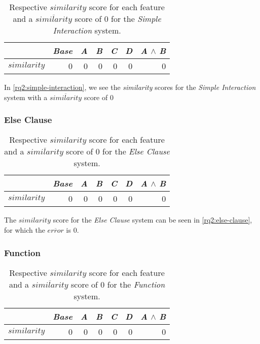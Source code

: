 \begin{table}[H]
    \centering
    \begin{tabular}{lrrrrrr}    \toprule
               & \emph{Base} & \emph{A} & \emph{B} & \emph{C} & \emph{D} & \emph{A} $\land$ \emph{B}   \\ \midrule
    $similarity$ & 0 & 0 & 0 & 0 & 0 & 0      \\ \bottomrule
    \end{tabular}
    \caption{Respective $similarity$ score for each feature and a $\overline{similarity}$ score of $0$ for the \emph{Simple Interaction} system.}
    \label{rq2:simple-interaction}
\end{table}

In \autoref{rq2:simple-interaction}, we see the \emph{similarity} scores for the \emph{Simple Interaction} system with a 
$\overline{similarity}$ score of $0$

\subsubsection*{Else Clause}

\begin{table}[H]
    \centering
    \begin{tabular}{lrrrrrr}    \toprule
               & \emph{Base} & \emph{A} & \emph{B} & \emph{C} & \emph{D} & \emph{A} $\land$ \emph{B}   \\ \midrule
    $similarity$ & 0 & 0 & 0 & 0 & 0 & 0      \\ \bottomrule
    \end{tabular}
    \caption{Respective $similarity$ score for each feature and a $\overline{similarity}$ score of $0$ for the \emph{Else Clause} system.}
    \label{rq2:else-clause}
\end{table}

The $similarity$ score for the \emph{Else Clause} system can be seen in \autoref{rq2:else-clause}, for which the 
$\overline{error}$ is $0$.

\subsubsection*{Function}

\begin{table}[H]
    \centering
    \begin{tabular}{lrrrrrr}    \toprule
               & \emph{Base} & \emph{A} & \emph{B} & \emph{C} & \emph{D} & \emph{A} $\land$ \emph{B}   \\ \midrule
    $similarity$ & 0 & 0 & 0 & 0 & 0 & 0      \\ \bottomrule
    \end{tabular}
    \caption{Respective $similarity$ score for each feature and a $\overline{similarity}$ score of $0$ for the \emph{Function} system.}
    \label{rq2:function}
\end{table}
    
